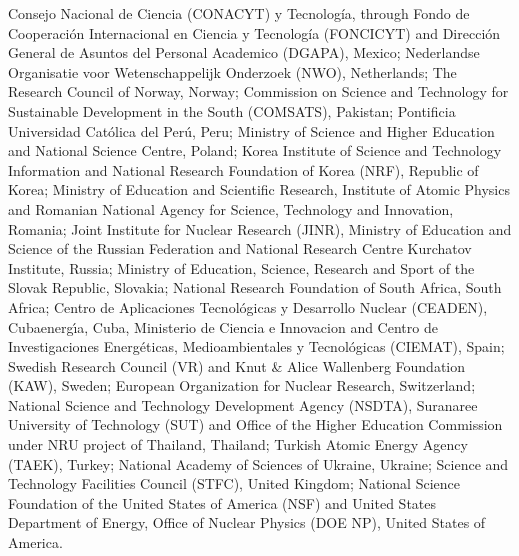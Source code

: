 %
Consejo Nacional de Ciencia (CONACYT) y Tecnolog\'{i}a, through Fondo de Cooperaci\'{o}n Internacional en Ciencia y Tecnolog\'{i}a (FONCICYT) and Direcci\'{o}n General de Asuntos del Personal Academico (DGAPA), Mexico;
%
Nederlandse Organisatie voor Wetenschappelijk Onderzoek (NWO), Netherlands;
%
The Research Council of Norway, Norway;
%
Commission on Science and Technology for Sustainable Development in the South (COMSATS), Pakistan;
%
Pontificia Universidad Cat\'{o}lica del Per\'{u}, Peru;
%
Ministry of Science and Higher Education and National Science Centre, Poland;
%
Korea Institute of Science and Technology Information and National Research Foundation of Korea (NRF), Republic of Korea;
%
Ministry of Education and Scientific Research, Institute of Atomic Physics and Romanian National Agency for Science, Technology and Innovation, Romania;
%
Joint Institute for Nuclear Research (JINR), Ministry of Education and Science of the Russian Federation and National Research Centre Kurchatov Institute, Russia;
%
Ministry of Education, Science, Research and Sport of the Slovak Republic, Slovakia;
%
National Research Foundation of South Africa, South Africa;
%
Centro de Aplicaciones Tecnol\'{o}gicas y Desarrollo Nuclear (CEADEN), Cubaenerg\'{\i}a, Cuba, Ministerio de Ciencia e Innovacion and Centro de Investigaciones Energ\'{e}ticas, Medioambientales y Tecnol\'{o}gicas (CIEMAT), Spain;
%
Swedish Research Council (VR) and Knut \& Alice Wallenberg Foundation (KAW), Sweden;
%
European Organization for Nuclear Research, Switzerland;
%
National Science and Technology Development Agency (NSDTA), Suranaree University of Technology (SUT) and Office of the Higher Education Commission under NRU project of Thailand, Thailand;
%
Turkish Atomic Energy Agency (TAEK), Turkey;
%
National Academy of  Sciences of Ukraine, Ukraine;
%
Science and Technology Facilities Council (STFC), United Kingdom;
%
National Science Foundation of the United States of America (NSF) and United States Department of Energy, Office of Nuclear Physics (DOE NP), United States of America.